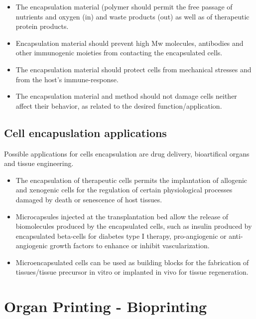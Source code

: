     \begin{multicols}{2}
        \begin{itemize}
            \item The encapsulation material (polymer should permit the free passage of nutrients and oxygen (in) and waste products (out) as well as of therapeutic protein products.
            \item Encapsulation material should prevent high Mw molecules, antibodies and other immunogenic moieties from contacting the encapsulated cells. 
            \item The encapsulation material should protect cells from mechanical stresses and from the host's immune-response.
            \item The encapsulation material and method should not damage cells neither affect their behavior, as related to the desired function/application.
        \end{itemize}
    \end{multicols}
    
    \subsection{Cell encapuslation applications}
    Possible applications for cells encapsulation are drug delivery, bioartifical organs and tissue engineering. 
    
    \begin{multicols}{2}
        \begin{itemize}
            \item The encapsulation of therapeutic cells permits the implantation of allogenic and xenogenic cells for the regulation of certain physiological processes damaged by death or senescence of host tissues. 
            \item Microcapsules injected at the transplantation bed allow the release of biomolecules produced by the encapsulated cells, such as insulin produced by encapsulated beta-cells for diabetes type I therapy, pro-angiogenic or anti-angiogenic growth factors to enhance or inhibit vascularization.
            \item Microencapsulated cells can be used as building blocks for the fabrication of tissues/tissue precursor in vitro or implanted in vivo for tissue regeneration.
        \end{itemize}   
    \end{multicols}

\section{Organ Printing - Bioprinting}

